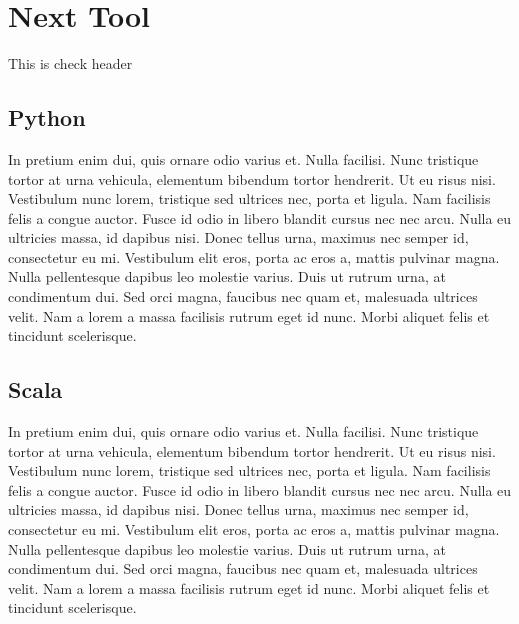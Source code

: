 \documentclass{report}
\begin{document}
    \begingroup
    \let\clearpage\relax
    \chapter{Next Tool}
    \endgroup
    \thispagestyle{fancy} %


    This is check header
    \section{Python}
	In pretium enim dui, quis ornare odio varius et. Nulla facilisi. Nunc tristique tortor at urna vehicula, elementum bibendum tortor hendrerit. Ut eu risus nisi. Vestibulum nunc lorem, tristique sed ultrices nec, porta et ligula. Nam facilisis felis a congue auctor. Fusce id odio in libero blandit cursus nec nec arcu. Nulla eu ultricies massa, id dapibus nisi. Donec tellus urna, maximus nec semper id, consectetur eu mi. Vestibulum elit eros, porta ac eros a, mattis pulvinar magna. Nulla pellentesque dapibus leo molestie varius. Duis ut rutrum urna, at condimentum dui. Sed orci magna, faucibus nec quam et, malesuada ultrices velit. Nam a lorem a massa facilisis rutrum eget id nunc. Morbi aliquet felis et tincidunt scelerisque.

    \section{Scala}
	In pretium enim dui, quis ornare odio varius et. Nulla facilisi. Nunc tristique tortor at urna vehicula, elementum bibendum tortor hendrerit. Ut eu risus nisi. Vestibulum nunc lorem, tristique sed ultrices nec, porta et ligula. Nam facilisis felis a congue auctor. Fusce id odio in libero blandit cursus nec nec arcu. Nulla eu ultricies massa, id dapibus nisi. Donec tellus urna, maximus nec semper id, consectetur eu mi. Vestibulum elit eros, porta ac eros a, mattis pulvinar magna. Nulla pellentesque dapibus leo molestie varius. Duis ut rutrum urna, at condimentum dui. Sed orci magna, faucibus nec quam et, malesuada ultrices velit. Nam a lorem a massa facilisis rutrum eget id nunc. Morbi aliquet felis et tincidunt scelerisque.
\end{document}
